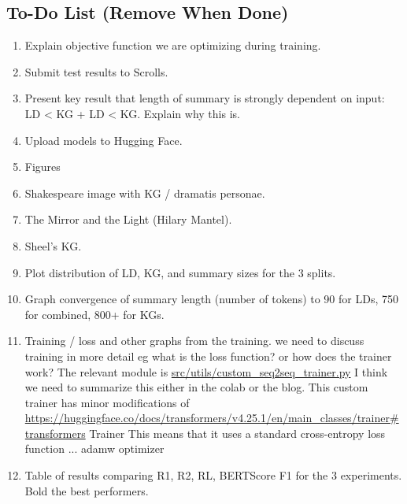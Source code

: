 \documentclass[12pt]{article}
\begin{document}

\subsection*{To-Do List (Remove When Done)}
\begin{enumerate}
\item Explain objective function we are optimizing during training.

\item Submit test results to Scrolls.


\item Present key result that length of summary is strongly dependent on input: LD < KG + LD < KG. Explain why this is.

\item Upload models to Hugging Face.

\item Figures

\item Shakespeare image with KG / dramatis personae.

\item The Mirror and the Light (Hilary Mantel).

\item Sheel's KG.

\item Plot distribution of LD, KG, and summary sizes for the 3 splits.

\item Graph convergence of summary length (number of tokens) to 90 for LDs, 750 for combined, 800+ for KGs.

\item Training / loss and other graphs from the training.
  we need to discuss training in more detail eg what is the loss function? or
  how does the trainer work? The relevant module is
\url{src/utils/custom_seq2seq_trainer.py}
I think we need to summarize this either in the colab or the blog. This custom
trainer has minor modifications of
\url{https://huggingface.co/docs/transformers/v4.25.1/en/main_classes/trainer#transformers}
Trainer This means that it uses a standard cross-entropy loss function ... adamw optimizer

\item Table of results comparing R1, R2, RL, BERTScore F1 for the 3 experiments. Bold the best performers.
\end{enumerate}
\end{document}
